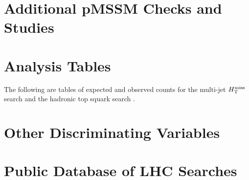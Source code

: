 \appendix
\chapter{Additional pMSSM Checks and Studies}
\label{app:pMSSMstudies}



\chapter{Analysis Tables}
\label{app:anatables}
The following are tables of expected and observed counts for the multi-jet $H_{\text{T}}^{\rm miss}$ search \cite{Khachatryan:2016kdk} and the hadronic top squark search \cite{CMS:2016nhb}.
%


\chapter{Other Discriminating Variables}
\label{app:discriminators}


\chapter{Public Database of LHC Searches}
\label{chap:ma5}


